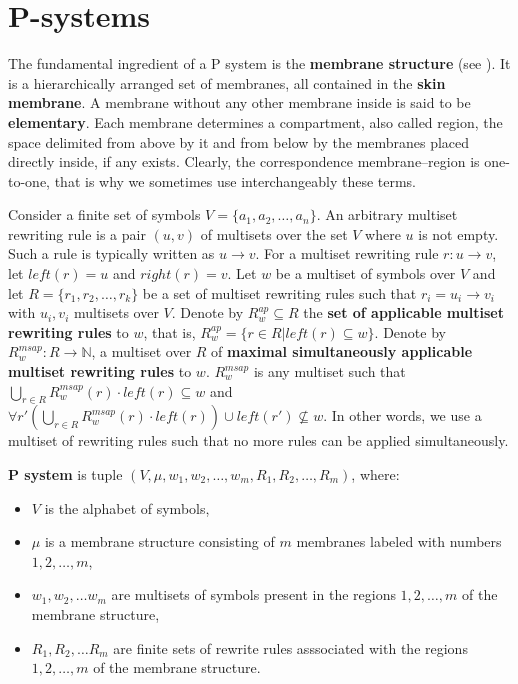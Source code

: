 \documentclass[a4paper,10pt]{article}
\begin{document}
\section{P-systems}



The fundamental ingredient of a P system is the {\bf membrane structure} (see \cite{Paun2006Introduction}). It is a hierarchically arranged set of membranes, all contained in the {\bf skin membrane}. A membrane without any other membrane inside is said to be {\bf elementary}. Each membrane determines a compartment, also called region, the space delimited from above by it and from below by the membranes placed directly inside, if any exists. Clearly, the correspondence membrane–region is one-to-one, that is why we sometimes use interchangeably these terms.


Consider a finite set of symbols $V=\{a_1, a_2,\dots, a_n\}$. An arbitrary multiset rewriting rule is a pair $(u, v)$ of multisets over the set $V$ where $u$ is not empty. Such a rule is typically written as $u\rightarrow v$. For a multiset rewriting rule $r : u\rightarrow v$, let $left(r) = u$ and $right(r) = v$. Let $w$ be a multiset of symbols over $V$ and let $R=\{r_1, r_2,\dots, r_k\}$ be a set of multiset rewriting rules such that $r_i = u_i\rightarrow v_i$ with $u_i, v_i$ multisets over $V$. Denote by $R^{ap}_w\subseteq R$ the {\bf set of applicable multiset rewriting rules} to $w$, that is, $R^{ap}_w = \{r\in R|left(r)\subseteq w\}$. Denote by $R^{msap}_w: R\rightarrow \mathbb N$, a multiset over $R$ of {\bf maximal simultaneously applicable multiset rewriting rules} to $w$. $R^{msap}_w$ is any multiset such that $\displaystyle\bigcup_{r\in R} R^{msap}_w(r)\cdot left(r)\subseteq w$ and $\forall r' \left(\displaystyle\bigcup_{r\in R} R^{msap}_w(r)\cdot left(r)\right)\cup left(r')\nsubseteq w$. In other words, we use a multiset of rewriting rules such that no more rules can be applied simultaneously.


{\bf P system} is tuple $(V, \mu, w_1, w_2,\dots , w_m, R_1, R_2, \dots , R_m)$, where:
\begin{itemize}
  \item $V$ is the alphabet of symbols,
  \item $\mu$ is a membrane structure consisting of $m$ membranes labeled with numbers $1,2,\dots,m$,
  \item $w_1,w_2,\dots w_m$ are multisets of symbols present in the regions $1,2,\dots,m$ of the membrane structure,
  \item $R_1,R_2,\dots R_m$ are finite sets of rewrite rules asssociated with the regions $1,2,\dots,m$ of the membrane structure.
\end{itemize}
  
\end{document}
